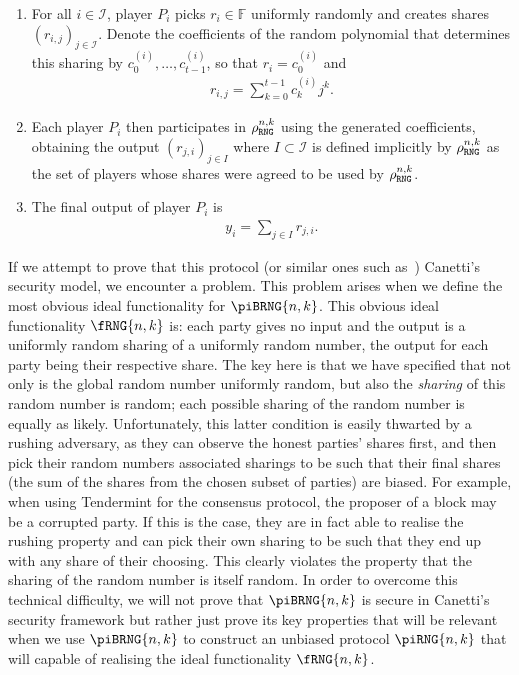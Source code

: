 \documentclass{article}
\theoremstyle{remark}
\newcommand{\F}{\mathbb{F}}
\begin{document}
\begin{enumerate}
	\item For all $i \in \mathcal{I}$, player $P_i$ picks $r_i \in \F$
		uniformly randomly and creates shares ${(r_{i,j})}_{j \in
		\mathcal{I}}$.  Denote the coefficients of the random polynomial that
		determines this sharing by $c_0^{(i)}, \ldots, c_{t-1}^{(i)}$, so that
		$r_i = c_0^{(i)}$ and
		\begin{align*}
			r_{i, j} = \sum_{k=0}^{t-1} c_k^{(i)} j^k.
		\end{align*}

	\item Each player $P_i$ then participates in $\rho_\texttt{RNG}^{n, k}$ using the
		generated coefficients, obtaining the output ${(r_{j, i})}_{j \in
		I}$ where $I \subset \mathcal{I}$ is defined implicitly by
		$\rho_\texttt{RNG}^{n, k}$ as the set of players whose shares were agreed to be
		used by $\rho_\texttt{RNG}^{n, k}$.

	\item The final output of player $P_i$ is
		\begin{align*}
			y_i = \sum_{j \in I} r_{j, i}.
		\end{align*}
\end{enumerate}

If we attempt to prove that this protocol (or similar ones such
as~\cite{gjkr96}) Canetti's security model, we encounter a problem. This
problem arises when we define the most obvious ideal functionality for
$\piBRNG{n,k}$. This obvious ideal functionality $\fRNG{n,k}$ is: each party
gives no input and the output is a uniformly random sharing of a uniformly
random number, the output for each party being their respective share. The key
here is that we have specified that not only is the global random number
uniformly random, but also the \textit{sharing} of this random number is
random; each possible sharing of the random number is equally as likely.
Unfortunately, this latter condition is easily thwarted by a rushing adversary,
as they can observe the honest parties' shares first, and then pick their
random numbers associated sharings to be such that their final shares (the sum
of the shares from the chosen subset of parties) are biased. For example, when
using Tendermint for the consensus protocol, the proposer of a block may be a
corrupted party. If this is the case, they are in fact able to realise the
rushing property and can pick their own sharing to be such that they end up
with any share of their choosing. This clearly violates the property that the
sharing of the random number is itself random. In order to overcome this
technical difficulty, we will not prove that $\piBRNG{n,k}$ is secure in
Canetti's security framework but rather just prove its key properties that will
be relevant when we use $\piBRNG{n,k}$ to construct an unbiased protocol
$\piRNG{n,k}$ that will capable of realising the ideal functionality
$\fRNG{n,k}$.
\end{document}
